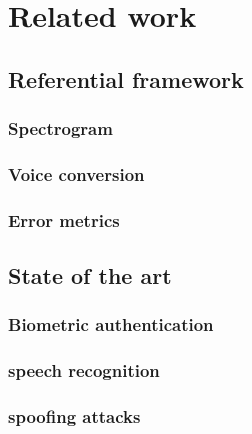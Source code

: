 \chapter{Related work}

\section{Referential framework}

\subsection{Spectrogram}

\subsection{Voice conversion}

\subsection{Error metrics}

\section{State of the art}

\subsection{Biometric authentication}

\subsection{speech recognition}

\subsection{spoofing attacks}

\endinput

